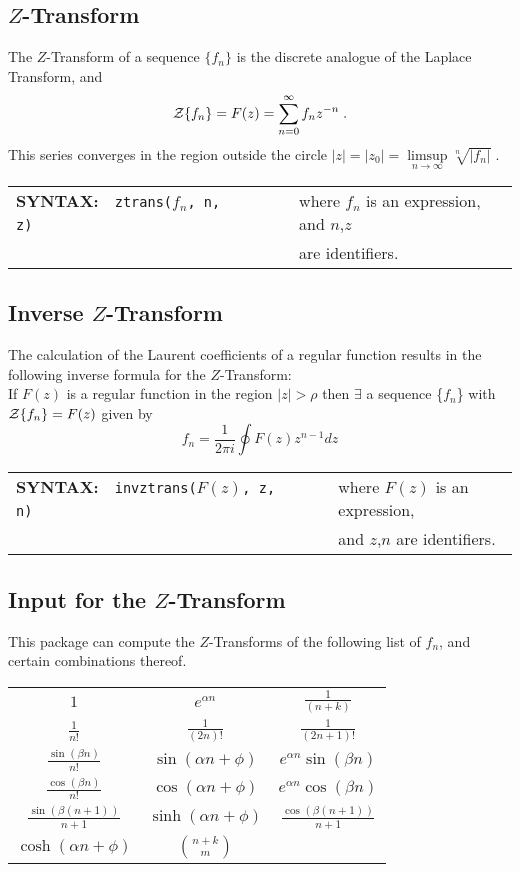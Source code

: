 
\subsection[Z-Transform]{$Z$-Transform}
  The $Z$-Transform of a sequence $\{f_n\}$ is the discrete analogue
  of the Laplace Transform, and
  \[{\cal Z}\{f_n\} = F(z) = \sum^\infty_{n=0} f_nz^{-n}\;.\]
  This series converges in the region outside the circle
  $|z|=|z_0|= \limsup\limits_{n \rightarrow \infty} \sqrt[n]{|f_n|}\;.$


\begin{tabular}{@{}l@{}l}
  {\bf SYNTAX:}\ \ {\tt ztrans($f_n$, n,  z)}\ \ \ \ \ \ \ \
  & where $f_n$ is an expression, and $n$,$z$ \\
  & are identifiers.
\end{tabular}


\subsection[Inverse Z-Transform]{Inverse $Z$-Transform}
  The calculation of the Laurent coefficients of a regular function
  results in the following inverse formula for the $Z$-Transform:
  \\
  If $F(z)$ is a regular function in the region $|z|> \rho$ then
  $\exists$ a sequence \{$f_n$\} with ${\cal Z} \{f_n\}=F(z)$
  given by
  \[f_n = \frac{1}{2 \pi i}\oint F(z) z^{n-1} dz\]


\begin{tabular}{@{}l@{}l}
  {\bf SYNTAX:}\ \ {\tt invztrans($F(z)$, z,  n)}\ \ \ \ \ \ \ \
  & where $F(z)$ is an expression, \\
  & and $z$,$n$ are identifiers.
\end{tabular}


\subsection[Input for the Z-Transform]{Input for the $Z$-Transform}

This package can compute the $Z$-Transforms of the following
list of $f_n$, and certain combinations thereof.

\begin{center}
  \renewcommand{\arraystretch}{2}
  \setlength{\tabcolsep}{5mm}
  \begin{tabular}{ccc}
    $1$ & $e^{\alpha n}$ & $\frac{1}{(n+k)}$ \\
    $\frac{1}{n!}$ & $\frac{1}{(2n)!}$ & $\frac{1}{(2n+1)!}$ \\
    $\frac{\sin(\beta n)}{n!}$ & $\sin(\alpha n+\phi)$ & $e^{\alpha n} \sin(\beta n)$ \\
    $\frac{\cos(\beta n)}{n!}$ & $\cos(\alpha n+\phi)$ & $e^{\alpha n} \cos(\beta n)$ \\
    $\frac{\sin(\beta (n+1))}{n+1}$ & $\sinh(\alpha n+\phi)$ & $\frac{\cos(\beta (n+1))}{n+1}$ \\
    $\cosh(\alpha n+\phi)$ & $\binom{n+k}{m}$
  \end{tabular}
\end{center}

